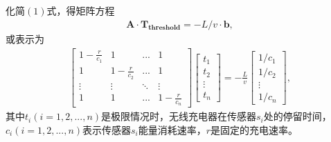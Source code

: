 \documentclass{whutmod}
\begin{document}
		化简$(1)$式，得矩阵方程
		\begin{gather}
		\bm A \cdot \bm{T_{threshold}}=-L/v \cdot \bm b,
		\end{gather}
		或表示为
		\begin{gather}
		\begin{bmatrix}
		1-\frac{r}{c_1} & 1 & ... & 1 \\ 
		1 & 1-\frac{r}{c_2} & ... & 1\\ 
		\vdots  & \vdots & \ddots  & \vdots \\ 
		1 & 1 & ... & 1-\frac{r}{c_n}
		\end{bmatrix}\begin{bmatrix}
		t_1\\ t_2\\ \vdots\\ t_n
		\end{bmatrix}=-\frac{L}{v}
		\begin{bmatrix}
		1/c_1\\ 1/c_2\\ \vdots\\ 1/c_n
		\end{bmatrix},
		\end{gather}
		其中$t_i(i=1,2,...,n)$是极限情况时，无线充电器在传感器$s_i$处的停留时间，$c_i(i=1,2,...,n)$表示传感器$s_i$能量消耗速率，$r$是固定的充电速率。
		
\end{document}
